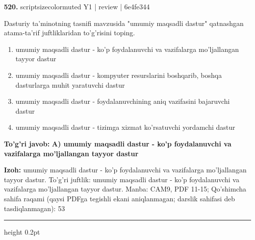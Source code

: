 \documentclass[10pt,a4paper]{article}
\begin{document}
{\bfseries\sffamily\color{ink} 520.} {scriptsizecolor{muted} Y1 | review | 6e4fe344}
\par
Dasturiy ta'minotning tasnifi mavzusida "umumiy maqsadli dastur" qatnashgan atama-ta'rif juftliklaridan to'g'risini toping.
\begin{enumerate}[label=\Alph*),leftmargin=9mm]
\item umumiy maqsadli dastur - ko'p foydalanuvchi va vazifalarga mo'ljallangan tayyor dastur
\item umumiy maqsadli dastur - kompyuter resurslarini boshqarib, boshqa dasturlarga muhit yaratuvchi dastur
\item umumiy maqsadli dastur - foydalanuvchining aniq vazifasini bajaruvchi dastur
\item umumiy maqsadli dastur - tizimga xizmat ko'rsatuvchi yordamchi dastur
\end{enumerate}
\begin{tcolorbox}[enhanced,breakable,colback=teal!4,colframe=teal!60!black,boxrule=0.45pt,arc=1.2mm,left=2.7mm,right=2.7mm,top=1.8mm,bottom=1.8mm,before skip=2mm,after skip=2mm]
{\bfseries\sffamily\color{teal}To'g'ri javob:} \textbf{A) umumiy maqsadli dastur - ko'p foydalanuvchi va vazifalarga mo'ljallangan tayyor dastur}
\par\smallskip
{\bfseries Izoh:} umumiy maqsadli dastur - ko'p foydalanuvchi va vazifalarga mo'ljallangan tayyor dastur. To'g'ri juftlik: umumiy maqsadli dastur - ko'p foydalanuvchi va vazifalarga mo'ljallangan tayyor dastur. Manba: CAM9, PDF 11-15; Qo'shimcha sahifa raqami (qaysi PDFga tegishli ekani aniqlanmagan; darslik sahifasi deb tasdiqlanmagan): 53
\end{tcolorbox}
\vspace{2mm}\hrule height 0.2pt\vspace{3mm}
\end{document}
